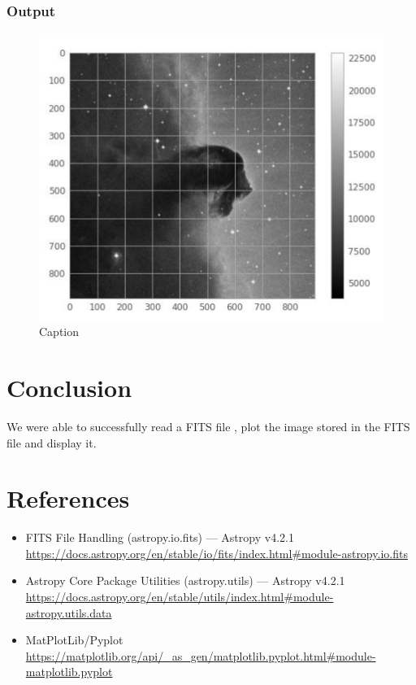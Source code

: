 \documentclass[letterpaper,11pt]{report}
\begin{document}
\subsubsection{Output}
\begin{figure}[h]
    \centering
    \includegraphics{horsey.png}
    \caption{Caption}
    \label{fig:my_label}
\end{figure}

\section{Conclusion}
 We were able to successfully read a FITS file , plot the image stored in the FITS file and display it.
 
\section{References}
\begin{itemize}
    \item FITS File Handling (astropy.io.fits) — Astropy v4.2.1 \\ \href{https://docs.astropy.org/en/stable/io/fits/index.html#module-astropy.io.fits}{https://docs.astropy.org/en/stable/io/fits/index.html#module-astropy.io.fits}
    \item Astropy Core Package Utilities (astropy.utils) — Astropy v4.2.1 \\
    \href{https://docs.astropy.org/en/stable/utils/index.html#module-astropy.utils.data}{https://docs.astropy.org/en/stable/utils/index.html#module-astropy.utils.data}
    \item MatPlotLib/Pyplot \\ \href{https://matplotlib.org/api/_as_gen/matplotlib.pyplot.html#module-matplotlib.pyplot}{https://matplotlib.org/api/_as_gen/matplotlib.pyplot.html#module-matplotlib.pyplot}
\end{itemize}
\end{document}

